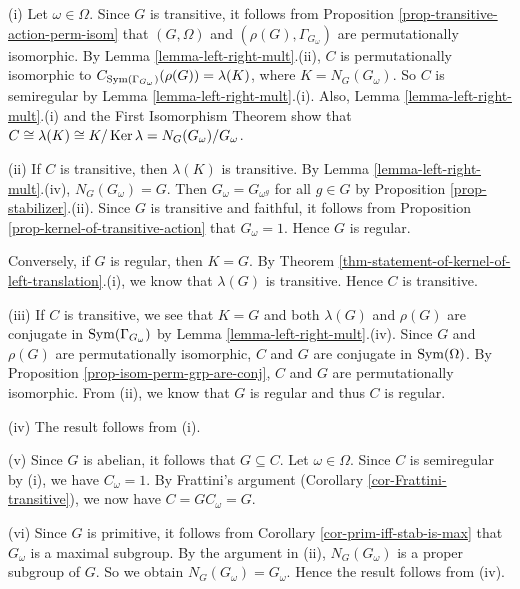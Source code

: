 \begin{sketch}
(i) Let $\omega\in\Omega$. Since $G$ is transitive, it follows from Proposition \ref{prop-transitive-action-perm-isom} that $(G,\Omega)$ and $(\rho(G),\Gamma_{G_\omega})$ are permutationally isomorphic. By Lemma \ref{lemma-left-right-mult}.(ii), $C$ is permutationally isomorphic to $C_{\operatorname{Sym}(\Gamma_{G_\omega})}(\rho(G)) = \lambda(K)$, where $K = N_G(G_\omega)$. So $C$ is semiregular by Lemma \ref{lemma-left-right-mult}.(i). Also, Lemma \ref{lemma-left-right-mult}.(i) and the First Isomorphism Theorem show that
	$
		C \cong \lambda(K) \cong K/\operatorname{Ker} \lambda  = N_G(G_\omega)/G_\omega$.
	
	(ii) If $C$ is transitive, then $\lambda(K)$ is transitive. By Lemma \ref{lemma-left-right-mult}.(iv), $N_G(G_\omega) = G$.  Then $G_\omega =G_{\omega^g}$ for all $g\in G$ by Proposition \ref{prop-stabilizer}.(ii). Since $G$ is transitive and faithful, it follows from Proposition \ref{prop-kernel-of-transitive-action} that $G_\omega = 1$. Hence $G$ is regular. 
	
	Conversely, if $G$ is regular, then $K = G$. By Theorem \ref{thm-statement-of-kernel-of-left-translation}.(i), we know that $\lambda(G)$ is transitive. Hence $C$ is transitive.
	
	(iii) If $C$ is transitive, we see that $K = G$ and both $\lambda(G)$ and $\rho(G)$ are conjugate in $\operatorname{Sym}(\Gamma_{G_\omega})$ by Lemma \ref{lemma-left-right-mult}.(iv). Since $G$ and $\rho(G)$ are permutationally isomorphic, $C$ and $G$ are conjugate in $\operatorname{Sym}(\Omega)$. By Proposition \ref{prop-isom-perm-grp-are-conj}, $C$ and $G$ are permutationally isomorphic. From (ii), we know that $G$ is regular and thus $C$ is regular.
	
	(iv) The result follows from (i).
	
	(v) Since $G$ is abelian, it follows that $G \subseteq C$. Let $\omega \in \Omega$.  Since $C$ is semiregular by (i), we have $C_\omega = 1$. By Frattini's argument (Corollary \ref{cor-Frattini-transitive}), we now have $C = GC_\omega = G$.
	
	(vi) Since $G$ is primitive, it follows from Corollary \ref{cor-prim-iff-stab-is-max} that $G_\omega$ is a maximal subgroup. By the argument in (ii), $N_G(G_\omega)$ is a proper subgroup of $G$. So we obtain $N_G(G_\omega) = G_\omega$. Hence the result follows from (iv).
\end{sketch}


